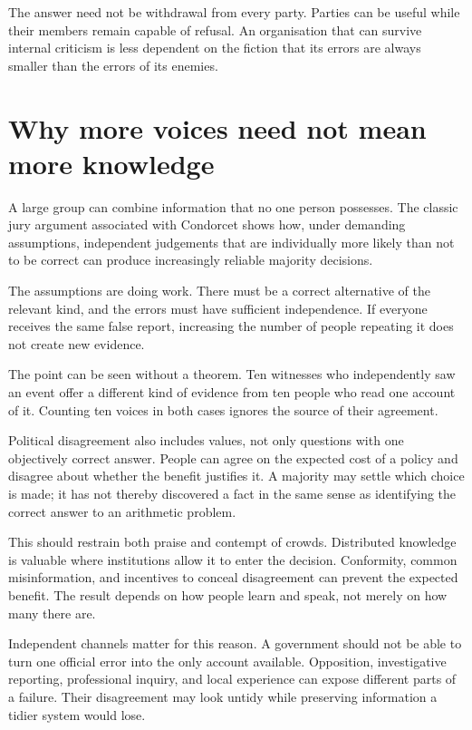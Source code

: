 \documentclass[12pt,a4paper]{book}
\begin{document}
The answer need not be withdrawal from every party. Parties can be useful while their members remain capable of refusal. An organisation that can survive internal criticism is less dependent on the fiction that its errors are always smaller than the errors of its enemies.

\section*{Why more voices need not mean more knowledge}

A large group can combine information that no one person possesses. The classic jury argument associated with Condorcet shows how, under demanding assumptions, independent judgements that are individually more likely than not to be correct can produce increasingly reliable majority decisions.

The assumptions are doing work. There must be a correct alternative of the relevant kind, and the errors must have sufficient independence. If everyone receives the same false report, increasing the number of people repeating it does not create new evidence.

The point can be seen without a theorem. Ten witnesses who independently saw an event offer a different kind of evidence from ten people who read one account of it. Counting ten voices in both cases ignores the source of their agreement.

Political disagreement also includes values, not only questions with one objectively correct answer. People can agree on the expected cost of a policy and disagree about whether the benefit justifies it. A majority may settle which choice is made; it has not thereby discovered a fact in the same sense as identifying the correct answer to an arithmetic problem.

This should restrain both praise and contempt of crowds. Distributed knowledge is valuable where institutions allow it to enter the decision. Conformity, common misinformation, and incentives to conceal disagreement can prevent the expected benefit. The result depends on how people learn and speak, not merely on how many there are.

Independent channels matter for this reason. A government should not be able to turn one official error into the only account available. Opposition, investigative reporting, professional inquiry, and local experience can expose different parts of a failure. Their disagreement may look untidy while preserving information a tidier system would lose.
\end{document}
